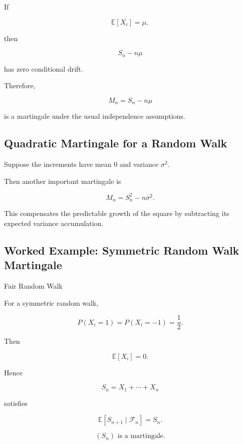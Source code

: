 If

\[
\mathbb{E}[X_i]=\mu,
\]

then

\[
S_n-n\mu
\]

has zero conditional drift.

Therefore,

\[
\boxed{
M_n
=
S_n-n\mu
}
\]

is a martingale under the usual independence assumptions.

\subsection{Quadratic Martingale for a Random Walk}
\label{subsec:quadratic-random-walk-martingale}

Suppose the increments have mean \(0\) and variance \(\sigma^2\).

Then another important martingale is

\[
\boxed{
M_n
=
S_n^2-n\sigma^2.
}
\]

This compensates the predictable growth of the square by subtracting its
expected variance accumulation.

\subsection{Worked Example: Symmetric Random Walk Martingale}
\label{subsec:worked-random-walk-martingale}

\begin{workedexamplebox}{Fair Random Walk}

For a symmetric random walk,

\[
P(X_i=1)=P(X_i=-1)=\frac12.
\]

Then

\[
\mathbb{E}[X_i]=0.
\]

Hence

\[
S_n
=
X_1+\cdots+X_n
\]

satisfies

\[
\mathbb{E}[S_{n+1}\mid\mathcal{F}_n]
=
S_n.
\]

\begin{answerbox}
\[
\boxed{
(S_n)
\text{ is a martingale}.
}
\]
\end{answerbox}

\end{workedexamplebox}

